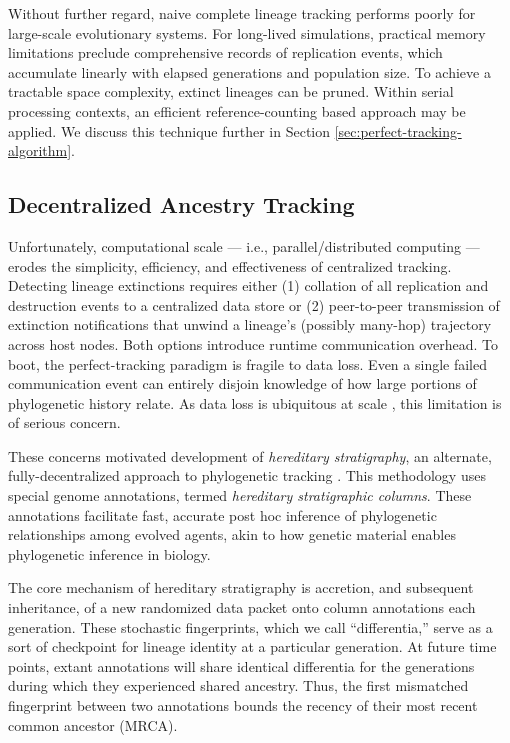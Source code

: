 Without further regard, naive complete lineage tracking performs poorly for large-scale evolutionary systems.
For long-lived simulations, practical memory limitations preclude comprehensive records of replication events, which accumulate linearly with elapsed generations and population size.
To achieve a tractable space complexity, extinct lineages can be pruned.
Within serial processing contexts, an efficient reference-counting based approach may be applied.
We discuss this technique further in Section \ref{sec:perfect-tracking-algorithm}.

\subsection{Decentralized Ancestry Tracking}

Unfortunately, computational scale --- i.e., parallel/distributed computing --- erodes the simplicity, efficiency, and effectiveness of centralized tracking.
Detecting lineage extinctions requires either (1) collation of all replication and destruction events to a centralized data store or (2) peer-to-peer transmission of extinction notifications that unwind a lineage's (possibly many-hop) trajectory across host nodes.
Both options introduce runtime communication overhead.
To boot, the perfect-tracking paradigm is fragile to data loss.
Even a single failed communication event can entirely disjoin knowledge of how large portions of phylogenetic history relate.
As data loss is ubiquitous at scale \citep{cappello2014toward,ackley2011pursue}, this limitation is of serious concern.

These concerns motivated development of \textit{hereditary stratigraphy}, an alternate, fully-decentralized approach to phylogenetic tracking \citep{moreno2022hereditary}.
This methodology uses special genome annotations, termed \textit{hereditary stratigraphic columns}.
These annotations facilitate fast, accurate post hoc inference of phylogenetic relationships among evolved agents, akin to how genetic material enables phylogenetic inference in biology.

The core mechanism of hereditary stratigraphy is accretion, and subsequent inheritance, of a new randomized data packet onto column annotations each generation.
These stochastic fingerprints, which we call ``differentia,'' serve as a sort of checkpoint for lineage identity at a particular generation.
At future time points, extant annotations will share identical differentia for the generations during which they experienced shared ancestry.
Thus, the first mismatched fingerprint between two annotations bounds the recency of their most recent common ancestor (MRCA).

